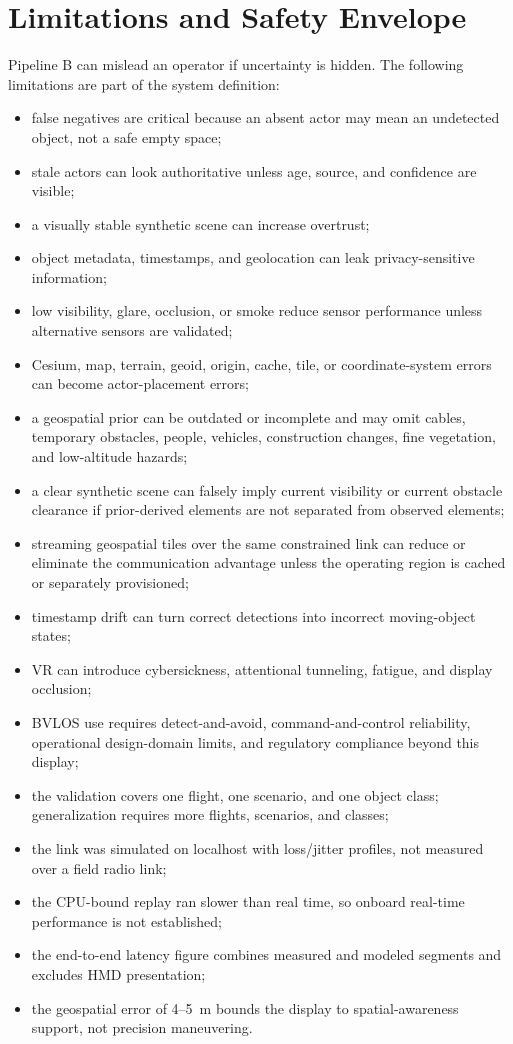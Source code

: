 \documentclass[fleqn]{VRIH2025}
\begin{document}
\section{Limitations and Safety Envelope}

Pipeline B can mislead an operator if uncertainty is hidden. The following limitations are part of the system definition:

\begin{itemize}
    \item false negatives are critical because an absent actor may mean an undetected object, not a safe empty space;
    \item stale actors can look authoritative unless age, source, and confidence are visible;
    \item a visually stable synthetic scene can increase overtrust;
    \item object metadata, timestamps, and geolocation can leak privacy-sensitive information;
    \item low visibility, glare, occlusion, or smoke reduce sensor performance unless alternative sensors are validated;
    \item Cesium, map, terrain, geoid, origin, cache, tile, or coordinate-system errors can become actor-placement errors;
    \item a geospatial prior can be outdated or incomplete and may omit cables, temporary obstacles, people, vehicles, construction changes, fine vegetation, and low-altitude hazards;
    \item a clear synthetic scene can falsely imply current visibility or current obstacle clearance if prior-derived elements are not separated from observed elements;
    \item streaming geospatial tiles over the same constrained link can reduce or eliminate the communication advantage unless the operating region is cached or separately provisioned;
    \item timestamp drift can turn correct detections into incorrect moving-object states;
    \item VR can introduce cybersickness, attentional tunneling, fatigue, and display occlusion;
    \item BVLOS use requires detect-and-avoid, command-and-control reliability, operational design-domain limits, and regulatory compliance beyond this display;
    \item the validation covers one flight, one scenario, and one object class; generalization requires more flights, scenarios, and classes;
    \item the link was simulated on localhost with loss/jitter profiles, not measured over a field radio link;
    \item the CPU-bound replay ran slower than real time, so onboard real-time performance is not established;
    \item the end-to-end latency figure combines measured and modeled segments and excludes HMD presentation;
    \item the geospatial error of 4--5~m bounds the display to spatial-awareness support, not precision maneuvering.
\end{itemize}
\end{document}
